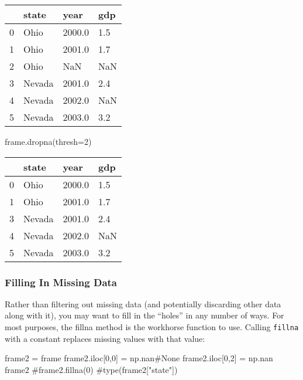 \documentclass[
  letterpaper,
  DIV=11,
  numbers=noendperiod]{scrreprt}
\newenvironment{Shaded}{\begin{snugshade}}{\end{snugshade}}
\newcommand{\CommentTok}[1]{\textcolor[rgb]{0.37,0.37,0.37}{#1}}
\newcommand{\DecValTok}[1]{\textcolor[rgb]{0.68,0.00,0.00}{#1}}
\newcommand{\NormalTok}[1]{\textcolor[rgb]{0.00,0.23,0.31}{#1}}
\newcommand{\OperatorTok}[1]{\textcolor[rgb]{0.37,0.37,0.37}{#1}}
\begin{document}
\begin{longtable}[]{@{}llll@{}}
\toprule()
& state & year & gdp \\
\midrule()
\endhead
0 & Ohio & 2000.0 & 1.5 \\
1 & Ohio & 2001.0 & 1.7 \\
2 & Ohio & NaN & NaN \\
3 & Nevada & 2001.0 & 2.4 \\
4 & Nevada & 2002.0 & NaN \\
5 & Nevada & 2003.0 & 3.2 \\
\bottomrule()
\end{longtable}

\begin{Shaded}
\begin{Highlighting}[]
\NormalTok{frame.dropna(thresh}\OperatorTok{=}\DecValTok{2}\NormalTok{)}
\end{Highlighting}
\end{Shaded}

\begin{longtable}[]{@{}llll@{}}
\toprule()
& state & year & gdp \\
\midrule()
\endhead
0 & Ohio & 2000.0 & 1.5 \\
1 & Ohio & 2001.0 & 1.7 \\
3 & Nevada & 2001.0 & 2.4 \\
4 & Nevada & 2002.0 & NaN \\
5 & Nevada & 2003.0 & 3.2 \\
\bottomrule()
\end{longtable}

\hypertarget{filling-in-missing-data}{%
\subsubsection{Filling In Missing Data}\label{filling-in-missing-data}}

Rather than filtering out missing data (and potentially discarding other
data along with it), you may want to fill in the ``holes'' in any number
of ways. For most purposes, the fillna method is the workhorse function
to use. Calling \texttt{fillna} with a constant replaces missing values
with that value:

\begin{Shaded}
\begin{Highlighting}[]
\NormalTok{frame2 }\OperatorTok{=}\NormalTok{ frame}
\NormalTok{frame2.iloc[}\DecValTok{0}\NormalTok{,}\DecValTok{0}\NormalTok{] }\OperatorTok{=}\NormalTok{ np.nan}\CommentTok{\#None}
\NormalTok{frame2.iloc[}\DecValTok{0}\NormalTok{,}\DecValTok{2}\NormalTok{] }\OperatorTok{=}\NormalTok{ np.nan}
\NormalTok{frame2}
\CommentTok{\#frame2.fillna(0)}
\CommentTok{\#type(frame2["state"])}
\end{Highlighting}
\end{Shaded}
\end{document}
